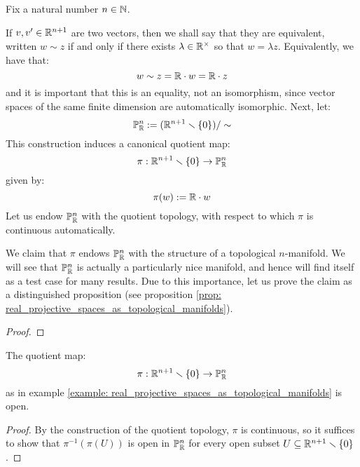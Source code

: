         \begin{example} \label{example: real_projective_spaces_as_topological_manifolds}
            Fix a natural number $n \in \mathbb{N}$.

            If $v, v' \in \mathbb{R}^{n + 1}$ are two vectors, then we shall say that they are equivalent, written $w \sim z$ if and only if there exists $\lambda \in \R^{\x}$ so that $w = \lambda z$. Equivalently, we have that:
                $$w \sim z = \mathbb{R} \cdot w = \mathbb{R} \cdot z$$
            and it is important that this is an equality, not an isomorphism, since vector spaces of the same finite dimension are automatically isomorphic. Next, let:
                $$\mathbb{P}^n_{\mathbb{R}} := (\mathbb{R}^{n + 1} \smallsetminus \{0\})/\sim$$
            This construction induces a canonical quotient map:
                $$\pi: \mathbb{R}^{n + 1} \smallsetminus \{0\} \to \mathbb{P}^n_{\mathbb{R}}$$
            given by:
                $$\pi(w) := \mathbb{R} \cdot w$$
            Let us endow $\mathbb{P}^n_{\mathbb{R}}$ with the quotient topology, with respect to which $\pi$ is continuous automatically.
            
            We claim that $\pi$ endows $\mathbb{P}^n_{\mathbb{R}}$ with the structure of a topological $n$-manifold. We will see that $\mathbb{P}^n_{\mathbb{R}}$ is actually a particularly nice manifold, and hence will find itself as a test case for many results. Due to this importance, let us prove the claim as a distinguished proposition (see proposition \ref{prop: real_projective_spaces_as_topological_manifolds}). 
        \end{example}
        \begin{lemma}
        \end{lemma}
            \begin{proof}
                
            \end{proof}
        \begin{corollary} \label{coro: projectivisation_is_open}
            The quotient map:
                $$\pi: \mathbb{R}^{n + 1} \smallsetminus \{0\} \to \mathbb{P}^n_{\mathbb{R}}$$
            as in example \ref{example: real_projective_spaces_as_topological_manifolds} is open.
        \end{corollary}
            \begin{proof}
                By the construction of the quotient topology, $\pi$ is continuous, so it suffices to show that $\pi^{-1}(\pi(U))$ is open in $\mathbb{P}^n_{\mathbb{R}}$ for every open subset $U \subseteq \mathbb{R}^{n + 1} \smallsetminus \{0\}$.
            \end{proof}
